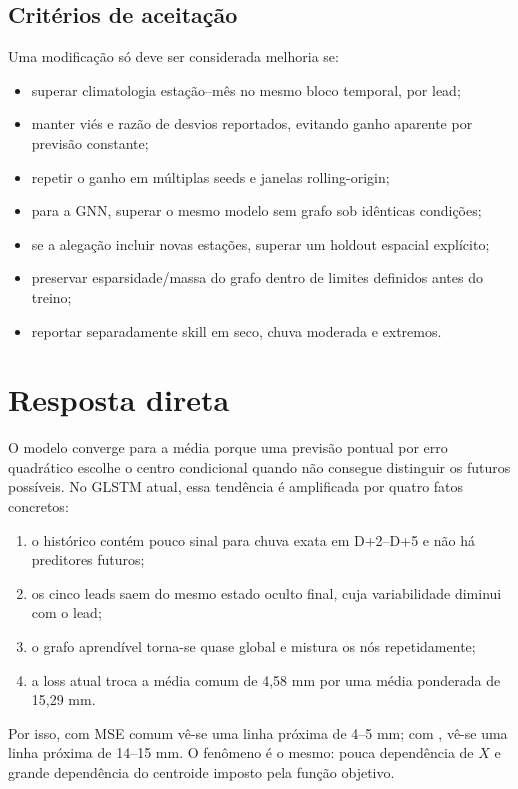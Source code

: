 \documentclass[11pt,a4paper]{article}
\newcommand{\code}[1]{\texttt{\detokenize{#1}}}
\begin{document}
\subsection{Critérios de aceitação}

Uma modificação só deve ser considerada melhoria se:

\begin{itemize}
  \item superar climatologia estação--mês no mesmo bloco temporal, por lead;
  \item manter viés e razão de desvios reportados, evitando ganho aparente por previsão constante;
  \item repetir o ganho em múltiplas seeds e janelas rolling-origin;
  \item para a GNN, superar o mesmo modelo sem grafo sob idênticas condições;
  \item se a alegação incluir novas estações, superar um holdout espacial explícito;
  \item preservar esparsidade/massa do grafo dentro de limites definidos antes do treino;
  \item reportar separadamente skill em seco, chuva moderada e extremos.
\end{itemize}

\section{Resposta direta}

O modelo converge para a média porque uma previsão pontual por erro quadrático escolhe o
centro condicional quando não consegue distinguir os futuros possíveis. No GLSTM atual, essa
tendência é amplificada por quatro fatos concretos:

\begin{enumerate}
  \item o histórico contém pouco sinal para chuva exata em D+2--D+5 e não há preditores futuros;
  \item os cinco leads saem do mesmo estado oculto final, cuja variabilidade diminui com o lead;
  \item o grafo aprendível torna-se quase global e mistura os nós repetidamente;
  \item a loss atual troca a média comum de 4,58 mm por uma média ponderada de 15,29 mm.
\end{enumerate}

Por isso, com MSE comum vê-se uma linha próxima de 4--5 mm; com
\code{quantile_mse}, vê-se uma linha próxima de 14--15 mm. O fenômeno é o mesmo: pouca
dependência de $X$ e grande dependência do centroide imposto pela função objetivo.
\end{document}
